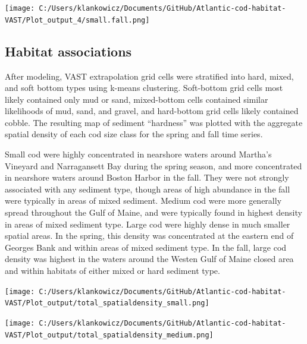 \documentclass[
]{article}
\let\origfigure\figure
\let\endorigfigure\endfigure
\renewenvironment{figure}[1][2] {
    \expandafter\origfigure\expandafter[H]
} {
    \endorigfigure
}
\begin{document}
\begin{figure}
\centering
\texttt{[image: C:/Users/klankowicz/Documents/GitHub/Atlantic-cod-habitat-VAST/Plot\_output\_4/small.fall.png]}
\caption{Figure 20: Small cod center of gravity and effective area occupied for all stock areas, fall seasons 1982 - 2021.}
\end{figure}

\hypertarget{habitat-associations}{%
\subsection{Habitat associations}\label{habitat-associations}}

After modeling, VAST extrapolation grid cells were stratified into hard, mixed, and soft bottom types using k-means clustering. Soft-bottom grid cells most likely contained only mud or sand, mixed-bottom cells contained similar likelihoods of mud, sand, and gravel, and hard-bottom grid cells likely contained cobble. The resulting map of sediment ``hardness'' was plotted with the aggregate spatial density of each cod size class for the spring and fall time series.

Small cod were highly concentrated in nearshore waters around Martha's Vineyard and Narragansett Bay during the spring season, and more concentrated in nearshore waters around Boston Harbor in the fall. They were not strongly associated with any sediment type, though areas of high abundance in the fall were typically in areas of mixed sediment. Medium cod were more generally spread throughout the Gulf of Maine, and were typically found in highest density in areas of mixed sediment type. Large cod were highly dense in much smaller spatial areas. In the spring, this density was concentrated at the eastern end of Georges Bank and within areas of mixed sediment type. In the fall, large cod density was highest in the waters around the Westen Gulf of Maine closed area and within habitats of either mixed or hard sediment type.

\begin{figure}
\centering
\texttt{[image: C:/Users/klankowicz/Documents/GitHub/Atlantic-cod-habitat-VAST/Plot\_output/total\_spatialdensity\_small.png]}
\caption{Figure 21: Small cod aggregate spatial density split by season, 1982 - 2021.}
\end{figure}

\begin{figure}
\centering
\texttt{[image: C:/Users/klankowicz/Documents/GitHub/Atlantic-cod-habitat-VAST/Plot\_output/total\_spatialdensity\_medium.png]}
\caption{Figure 22: Medium cod aggregate spatial density split by season, 1982 - 2021.}
\end{figure}
\end{document}
